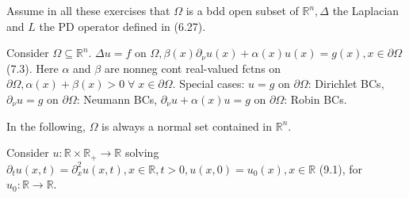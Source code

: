 \documentclass[a4paper,landscape]{article}
\newcommand{\R}{\mathbb{R}}
\newcommand{\ra}{\rightarrow}
\begin{document}
\fontsize{7.5}{6}
\selectfont
\begin{multicols}{3}

\selectfont


































Assume in all these exercises that $\Omega$ is a bdd open subset of $\R^n, \Delta$ the Laplacian and $L$ the PD operator defined in (6.27).









Consider  $\Omega \subseteq \R^n$. $\Delta u = f$ on $\Omega, \beta(x) \partial_{\nu} u(x) + \alpha(x) u(x) = g(x), x \in \partial \Omega$ (7.3). Here $\alpha$ and $\beta$ are nonneg cont real-valued fctns on $\partial \Omega, \alpha(x) + \beta(x) > 0 \; \forall \; x \in \partial \Omega$. Special cases:  $u = g$ on $\partial \Omega$: Dirichlet BCs, $\partial_{\nu}u = g$ on $\partial \Omega$: Neumann BCs, $\partial_{\nu} u + \alpha(x)u = g$ on $\partial \Omega$: Robin BCs.



In the following, $\Omega$ is always a normal set contained in $\R^n$. 





Consider $u: \R \times \R_+ \ra \R$ solving $\partial_t u(x,t) = \partial_x^2 u(x,t), x \in \R, t > 0, u(x,0) = u_0(x), x \in \R$ (9.1), for $u_0: \R \ra \R$. 










\end{multicols}
\end{document}
